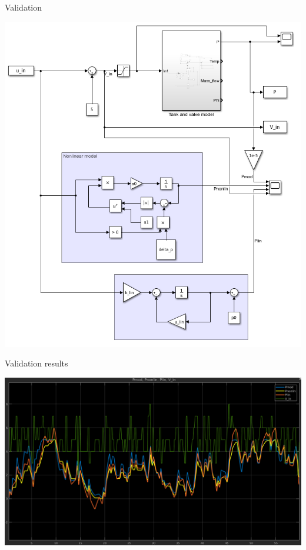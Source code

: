 \documentclass[presentation,aspectratio=1610]{beamer}
\begin{document}
\begin{frame}[label={sec:org23ab816}]{Validation}
\begin{center}
\includegraphics[width=0.55\linewidth]{../../figures/sysid-tank-validation-model.png}
\end{center}
\end{frame}

\begin{frame}[label={sec:orgc0ea29b}]{Validation results}
\begin{center}
\includegraphics[width=\linewidth]{../../figures/sysid-tank-valudation-results.png}
\end{center}
\end{frame}
\end{document}
